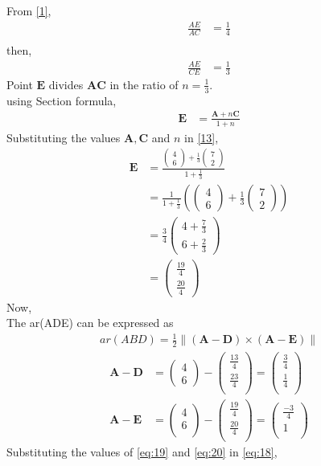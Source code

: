 \documentclass[12pt]{article}
\providecommand{\brak}[1]{\ensuremath{\left(#1\right)}}
\providecommand{\norm}[1]{\left\lVert#1\right\rVert}
\newcommand{\myvec}[1]{\ensuremath{\begin{pmatrix}#1\end{pmatrix}}}
\let\vec\mathbf
\begin{document}
\begin{enumerate}
From \eqref{1},
\begin{align}
\frac{AE}{AC} &=\frac{1}{4}\\
\end{align}
then,
\begin{align}
\frac{AE}{CE} &=\frac{1}{3}
\end{align}
Point $\vec{E}$ divides $\vec{A}\vec{C}$ in the ratio of $n = \frac{1}{3}$.\\
using Section formula,
\begin{align}
\vec{E} &=\frac{\vec{A}+n\vec{C}}{1+n}\label{13}
\end{align}
Substituting the values $\vec{A},\vec{C}$ and $n$ in \eqref{13},
\begin{align}
\vec{E} &=\frac{{\myvec{4\\6}+\frac{1}{3}\myvec{7\\2}}}{1+\frac{1}{3}}\\
	&=\frac{1}{1+\frac{1}{3}}\brak{{\myvec{4\\6}+\frac{1}{3}\myvec{7\\2}}} \\
	&=\frac{3}{4}\myvec{4+\frac{7}{3}\\6+\frac{2}{3}}\\
	&=\myvec{\frac{19}{4}\\ \frac{20}{4}}
\end{align}
Now,\\
		The ar(ADE) can be expressed as
  \begin{align}
	  ar(ABD)=\frac{1}{2} \norm{\brak{\vec{A}-\vec{D}}  \times 
   \brak{\vec{A}- \vec{E}}} \label{eq:18} 
\end{align}
\begin{align}
	\vec{A}- \vec{D} &= \myvec{4\\6}-\myvec{\frac{13}{4}\\ \frac{23}{4}\\}=\myvec{\frac{3}{4}\\ \frac{1}{4}\\}\label{eq:19}\\
	  \vec{A}- \vec{E} &= \myvec{4\\6\\}-\myvec{\frac{19}{4}\\ \frac{20}{4}\\}=\myvec{\frac{-3}{4}\\1\\}\label{eq:20}
  \end{align}
Substituting the values of \eqref{eq:19} and \eqref{eq:20} in \eqref{eq:18},
\begin{align}

\end{align}
\end{enumerate}
\end{document}
